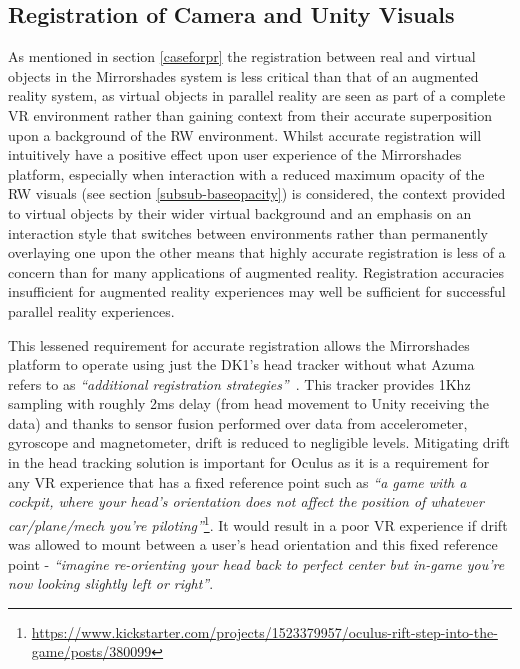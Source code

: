 
\subsection{Registration of Camera and Unity Visuals}
\label{registration-of-camera-and-unity-visuals}
As mentioned in section \ref{caseforpr} the registration between real and virtual objects in the Mirrorshades system is less critical than that of an augmented reality system, as virtual objects in parallel reality are seen as part of a complete VR environment rather than gaining context from their accurate superposition upon a background of the RW environment. Whilst accurate registration will intuitively have a positive effect upon user experience of the Mirrorshades platform, especially when interaction with a reduced maximum opacity of the RW visuals (see section \ref{subsub-baseopacity}) is considered, the context provided to virtual objects by their wider virtual background and an emphasis on an interaction style that switches between environments rather than permanently overlaying one upon the other means that highly accurate registration is less of a concern than for many applications of augmented reality. Registration accuracies insufficient for augmented reality experiences may well be sufficient for successful parallel reality experiences.

This lessened requirement for accurate registration allows the Mirrorshades platform to operate using just the DK1's head tracker without what Azuma refers to as \textit{``additional registration strategies''}~\cite{Azuma1997}. This tracker provides 1Khz sampling with roughly 2ms delay (from head movement to Unity receiving the data) and thanks to sensor fusion performed over data from accelerometer, gyroscope and magnetometer, drift is reduced to negligible levels. Mitigating drift in the head tracking solution is important for Oculus as it is a requirement for any VR experience that has a fixed reference point such as \textit{``a game with a cockpit, where your head's orientation does not affect the position of whatever car/plane/mech you're piloting''}\footnote{\url{https://www.kickstarter.com/projects/1523379957/oculus-rift-step-into-the-game/posts/380099}}\saveFN\rifttrackerfn. It would result in a poor VR experience if drift was allowed to mount between a user's head orientation and this fixed reference point - \textit{``imagine re-orienting your head back to perfect center but in-game you're now looking slightly left or right''}.

